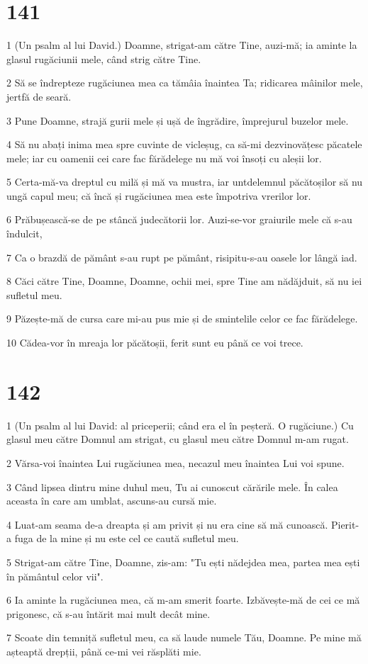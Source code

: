 \chapter{141}

\par 1 (Un psalm al lui David.) Doamne, strigat-am către Tine, auzi-mă; ia aminte la glasul rugăciunii mele, când strig către Tine.
\par 2 Să se îndrepteze rugăciunea mea ca tămâia înaintea Ta; ridicarea mâinilor mele, jertfă de seară.
\par 3 Pune Doamne, strajă gurii mele și ușă de îngrădire, împrejurul buzelor mele.
\par 4 Să nu abați inima mea spre cuvinte de vicleșug, ca să-mi dezvinovățesc păcatele mele; iar cu oamenii cei care fac fărădelege nu mă voi însoți cu aleșii lor.
\par 5 Certa-mă-va dreptul cu milă și mă va mustra, iar untdelemnul păcătoșilor să nu ungă capul meu; că încă și rugăciunea mea este împotriva vrerilor lor.
\par 6 Prăbușească-se de pe stâncă judecătorii lor. Auzi-se-vor graiurile mele că s-au îndulcit,
\par 7 Ca o brazdă de pământ s-au rupt pe pământ, risipitu-s-au oasele lor lângă iad.
\par 8 Căci către Tine, Doamne, Doamne, ochii mei, spre Tine am nădăjduit, să nu iei sufletul meu.
\par 9 Păzește-mă de cursa care mi-au pus mie și de smintelile celor ce fac fărădelege.
\par 10 Cădea-vor în mreaja lor păcătoșii, ferit sunt eu până ce voi trece.

\chapter{142}

\par 1 (Un psalm al lui David: al priceperii; când era el în peșteră. O rugăciune.) Cu glasul meu către Domnul am strigat, cu glasul meu către Domnul m-am rugat.
\par 2 Vărsa-voi înaintea Lui rugăciunea mea, necazul meu înaintea Lui voi spune.
\par 3 Când lipsea dintru mine duhul meu, Tu ai cunoscut cărările mele. În calea aceasta în care am umblat, ascuns-au cursă mie.
\par 4 Luat-am seama de-a dreapta și am privit și nu era cine să mă cunoască. Pierit-a fuga de la mine și nu este cel ce caută sufletul meu.
\par 5 Strigat-am către Tine, Doamne, zis-am: "Tu ești nădejdea mea, partea mea ești în pământul celor vii".
\par 6 Ia aminte la rugăciunea mea, că m-am smerit foarte. Izbăvește-mă de cei ce mă prigonesc, că s-au întărit mai mult decât mine.
\par 7 Scoate din temniță sufletul meu, ca să laude numele Tău, Doamne. Pe mine mă așteaptă drepții, până ce-mi vei răsplăti mie.


